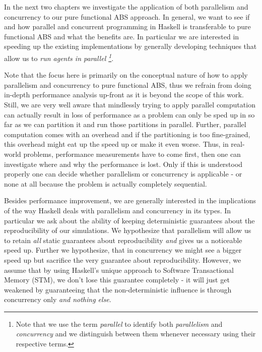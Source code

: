 In the next two chapters we investigate the application of both parallelism and concurrency to our pure functional ABS approach. In general, we want to see if and how parallel and concurrent programming in Haskell is transferable to pure functional ABS and what the benefits are. In particular we are interested in speeding up the existing implementations by generally developing techniques that allow us to  \textit{run agents in parallel \footnote{Note that we use the term \textit{parallel} to identify both \textit{parallelism} and \textit{concurrency} and we distinguish between them whenever necessary using their respective terms.}}. 

Note that the focus here is primarily on the conceptual nature of how to apply parallelism and concurrency to pure functional ABS, thus we refrain from doing in-depth performance analysis up-front as it is beyond the scope of this work. Still, we are very well aware that mindlessly trying to apply parallel computation can actually result in loss of performance as a problem can only be sped up in so far as we can partition it and run those partitions in parallel. Further, parallel computation comes with an overhead and if the partitioning is too fine-grained, this overhead might eat up the speed up or make it even worse. Thus, in real-world problems, performance measurements have to come first, then one can investigate where and why the performance is lost. Only if this is understood properly one can decide whether parallelism or concurrency is applicable - or none at all because the problem is actually completely sequential. %

Besides performance improvement, we are generally interested in the implications of the way Haskell deals with parallelism and concurrency in its types. In particular we ask about the ability of keeping deterministic guarantees about the reproducibility of our simulations. We hypothesize that parallelism will allow us to retain \textit{all} static guarantees about reproducibility \textit{and} gives us a noticeable speed up. Further we hypothesize, that in concurrency we might see a bigger speed up but sacrifice the very guarantee about reproducibility. However, we assume that by using Haskell's unique approach to Software Transactional Memory (STM), we don't lose this guarantee completely - it will just get weakened by guaranteeing that the non-deterministic influence is through concurrency only \textit{and nothing else}.



